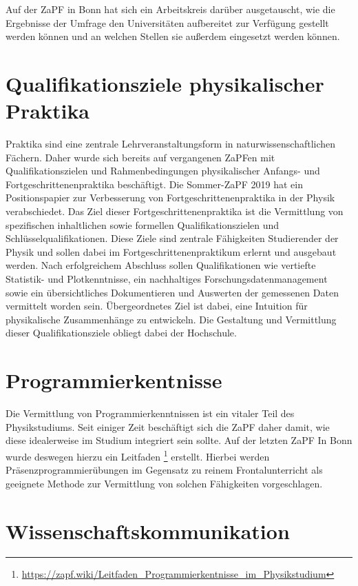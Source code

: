 Auf der ZaPF in Bonn hat sich ein Arbeitskreis darüber ausgetauscht, wie die Ergebnisse der Umfrage den Universitäten aufbereitet zur Verfügung gestellt werden können und an welchen Stellen sie außerdem eingesetzt werden können.

\section*{Qualifikationsziele physikalischer Praktika}

Praktika sind eine zentrale Lehrveranstaltungsform in naturwissenschaftlichen Fächern. Daher wurde sich bereits auf vergangenen ZaPFen mit Qualifikationszielen und Rahmenbedingungen physikalischer Anfangs- und Fortgeschrittenenpraktika beschäftigt. 
Die Sommer-ZaPF 2019 hat ein Positionspapier zur Verbesserung von Fortgeschrittenenpraktika in der Physik verabschiedet. 
Das Ziel dieser Fortgeschrittenenpraktika ist die Vermittlung von spezifischen inhaltlichen sowie formellen Qualifikationszielen und Schlüsselqualifikationen. Diese Ziele sind zentrale Fähigkeiten Studierender der Physik und sollen dabei im Fortgeschrittenenpraktikum erlernt und ausgebaut werden. Nach erfolgreichem Abschluss sollen Qualifikationen wie vertiefte Statistik- und Plotkenntnisse, ein nachhaltiges Forschungsdatenmanagement sowie ein übersichtliches Dokumentieren und Auswerten der gemessenen Daten vermittelt worden sein. Übergeordnetes Ziel ist dabei, eine Intuition für physikalische Zusammenhänge zu entwickeln. Die Gestaltung und Vermittlung dieser Qualifikationsziele obliegt dabei der Hochschule. 

\section*{Programmierkentnisse}

Die Vermittlung von Programmierkenntnissen ist ein vitaler Teil des Physikstudiums. Seit einiger Zeit beschäftigt sich die ZaPF daher damit, wie diese idealerweise im Studium integriert sein sollte. Auf der letzten ZaPF  In Bonn wurde deswegen hierzu ein Leitfaden \footnote{\url{https://zapf.wiki/Leitfaden_Programmierkentnisse_im_Physikstudium}} erstellt.
Hierbei werden Präsenzprogrammierübungen im Gegensatz zu reinem Frontalunterricht als geeignete Methode zur Vermittlung von solchen Fähigkeiten vorgeschlagen.

\section*{Wissenschaftskommunikation}

